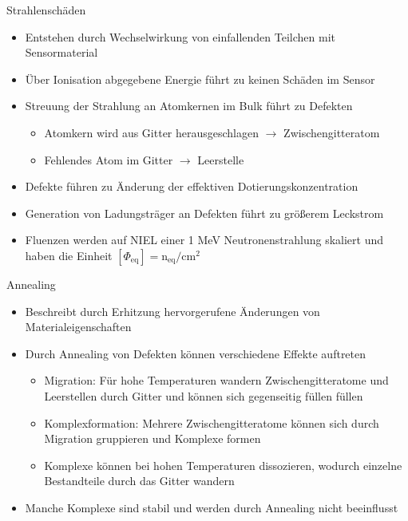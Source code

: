 \documentclass[aspectratio=43, 10pt]{beamer}
\begin{document}
\begin{frame}{Strahlenschäden}
  \begin{itemize}
    \item Entstehen durch Wechselwirkung von einfallenden Teilchen mit Sensormaterial
    \medskip
    \item Über Ionisation abgegebene Energie führt zu keinen Schäden im Sensor
    \medskip
    \item Streuung der Strahlung an Atomkernen im Bulk führt zu Defekten
      \begin{itemize}
        \item Atomkern wird aus Gitter herausgeschlagen $\rightarrow$ Zwischengitteratom
        \item Fehlendes Atom im Gitter $\rightarrow$ Leerstelle
      \end{itemize}
    \medskip
    \item Defekte führen zu Änderung der effektiven Dotierungskonzentration
    \medskip
    \item Generation von Ladungsträger an Defekten führt zu größerem Leckstrom
    \medskip
    \item Fluenzen werden auf NIEL einer 1 MeV Neutronenstrahlung skaliert und haben die Einheit $ [\Phi_{\mathrm{eq}}] = \mathrm{n_{\mathrm{eq}} /cm^2}$
  \end{itemize}
\end{frame}




\begin{frame}{Annealing}
  \begin{itemize}
    \item Beschreibt durch Erhitzung hervorgerufene Änderungen von Materialeigenschaften
    \medskip
    \item Durch Annealing von Defekten können verschiedene Effekte auftreten
      \begin{itemize}
        \item Migration: Für hohe Temperaturen wandern Zwischengitteratome und Leerstellen durch Gitter und
        können sich gegenseitig füllen füllen
        \medskip
        \item Komplexformation: Mehrere Zwischengitteratome können sich durch Migration gruppieren und Komplexe formen
        \medskip
        \item Komplexe können bei hohen Temperaturen dissozieren, wodurch einzelne Bestandteile durch das Gitter wandern
      \end{itemize}
    \medskip
    \item Manche Komplexe sind stabil und werden durch Annealing nicht beeinflusst
  \end{itemize}
\end{frame}
\end{document}

